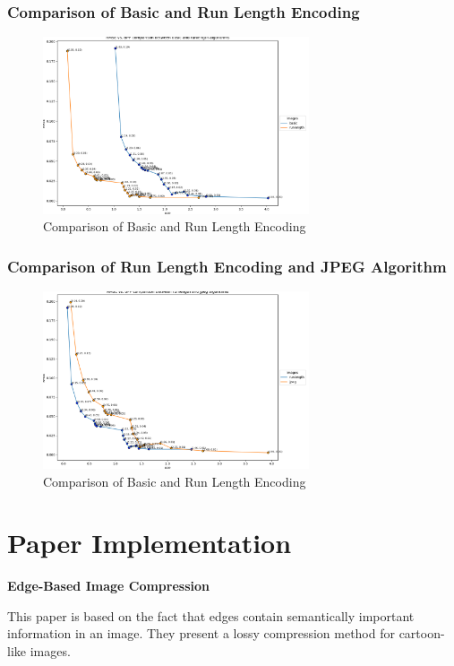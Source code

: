 \documentclass[Serif, 10pt, brown]{beamer}
\theoremstyle{example}
\theoremstyle{plain}
\begin{document}
\begin{frame}
	\frametitle{Comparison of Basic and Run Length Encoding}

	\begin{figure}
		\centering
		\includegraphics[width=0.7\textwidth]{../results/basic_runlength_comparison.png}
		\caption{Comparison of Basic and Run Length Encoding}
	\end{figure}
\end{frame}

\begin{frame}
	\frametitle{Comparison of Run Length Encoding and JPEG Algorithm}

	\begin{figure}
		\centering
		\includegraphics[width=0.7\textwidth]{../results/runlength_jpeg_comparison.png}
		\caption{Comparison of Basic and Run Length Encoding}
	\end{figure}
\end{frame}

\section{Paper Implementation}
\begin{frame}
    \centering
    {\Huge \textbf{Edge-Based Image Compression}}

	\vspace{1cm}
	This paper is based on the fact that edges contain semantically important information in an image. They present a lossy compression method for cartoon-like images.
\end{frame}
\end{document}
